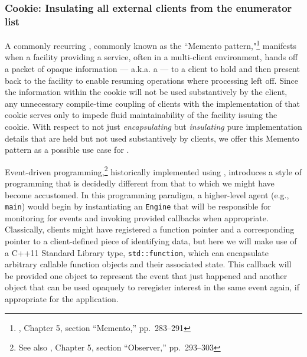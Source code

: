\subsubsection[Cookie: Insulating all external clients from the enumerator list]{Cookie: Insulating all external clients from the enumerator list}\label{cookie:-insulating-all-external-clients-from-the-enumerator-list}

A commonly recurring , commonly known as the
``Memento pattern,"\footnote{\cite{gamma95}, Chapter 5, section ``Memento,'' pp.~283--291} manifests when a facility providing a service, often in a
multi-client environment, hands off a packet of opaque information ---
a.k.a. a  --- to a client to hold and then present back to
the facility to enable resuming operations where processing left off.
Since the information within the cookie will not be used substantively
by the client, any unnecessary compile-time coupling of clients with the
implementation of that cookie serves only to impede fluid
maintainability of the facility issuing the cookie. With respect
to not just \emph{encapsulating} but \emph{insulating} pure
implementation details that are held but not used substantively by
clients, we offer this Memento pattern as a possible use case
for .

Event-driven programming,\footnote{See also \cite{gamma95}, Chapter 5, section ``Observer,''  pp.~293--303} historically implemented using , introduces a style of programming that is decidedly
different from that to which we might have become accustomed. In this
programming paradigm, a higher-level agent (e.g., \lstinline!main!) would
begin by instantiating an \lstinline!Engine! that will be responsible for
monitoring for events and invoking provided callbacks when appropriate.
Classically, clients might have registered a function pointer and a
corresponding pointer to a client-defined piece of identifying data, but
here we will make use of a C++11 Standard Library type,
\lstinline!std::function!, which can encapsulate arbitrary callable
function objects and their associated state. This callback will be
provided one object to represent the event that just happened and
another object that can be used opaquely to reregister interest in the
same event again, if appropriate for the application.


